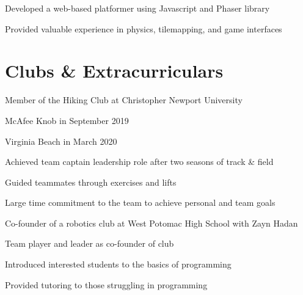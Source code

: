 \documentclass[]{deedy-resume-openfont}
\begin{document}
\begin{minipage}[t]{0.66\textwidth}
\begin{tightemize}
\item Developed a web-based platformer using Javascript and Phaser library
\item Provided valuable experience in physics, tilemapping, and game interfaces  
\end{tightemize} 
\sectionsep


\section{Clubs \& Extracurriculars}
Member of the Hiking Club at Christopher Newport University 
\begin{tightemize}
\item McAfee Knob in September 2019
\item Virginia Beach in March 2020
\end{tightemize}
\sectionsep
{}
Achieved team captain leadership role after two seasons of track \& field
\begin{tightemize}
\item Guided teammates through exercises and lifts
\item Large time commitment to the team to achieve personal and team goals
\end{tightemize}
\sectionsep
{}
Co-founder of a robotics club at West Potomac High School with Zayn Hadan
\begin{tightemize}
\item Team player and leader as co-founder of club
\item Introduced interested students to the basics of programming
\item Provided tutoring to those struggling in programming
\end{tightemize}
\sectionsep

\end{minipage} 
\end{document}
